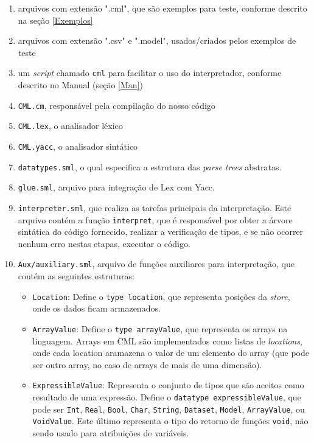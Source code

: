 \documentclass[12pt]{article}
\begin{document}
\begin{enumerate}
	\item arquivos com extensão ".cml", que são exemplos para teste, conforme descrito na seção \ref{Exemplos}
	\item arquivos com extensão ".csv" e ".model", usados/criados pelos exemplos de teste
	\item um \textit{script} chamado \texttt{cml} para facilitar o uso do interpretador, conforme descrito no Manual (seção \ref{Man})
	\item \texttt{CML.cm}, responsável pela compilação do nosso código
	\item \texttt{CML.lex}, o analisador léxico
	\item \texttt{CML.yacc}, o analisador sintático
	\item \texttt{datatypes.sml}, o qual especifica a estrutura das \textit{parse trees} abstratas.
	\item \texttt{glue.sml}, arquivo para integração de Lex com Yacc.
	\item \texttt{interpreter.sml}, que realiza as tarefas principais da interpretação. Este arquivo contém a função \texttt{interpret}, que é responsável por obter a árvore sintática do código fornecido, realizar a verificação de tipos, e se não ocorrer nenhum erro nestas etapas, executar o código.
	\item \texttt{Aux/auxiliary.sml}, arquivo de funções auxiliares para interpretação, que contém as seguintes estruturas:
\begin{itemize}
\item \texttt{Location}: Define o  \texttt{type location}, que representa posições da \textit{store}, onde os dados ficam armazenados.

\item \texttt{ArrayValue}: Define o \texttt{type arrayValue}, que representa os arrays na linguagem. Arrays em CML são implementados como listas de \textit{locations}, onde cada location aramazena o valor de um elemento do array (que pode ser outro array, no caso de arrays de mais de uma dimensão).

\item \texttt{ExpressibleValue}: Representa o conjunto de tipos que são aceitos como resultado de uma expressão. Define o \texttt{datatype expressibleValue}, que pode ser \texttt{Int}, \texttt{Real}, \texttt{Bool}, \texttt{Char}, \texttt{String}, \texttt{Dataset}, \texttt{Model}, \texttt{ArrayValue}, ou \texttt{VoidValue}. Este último representa o tipo do retorno de funções \texttt{void}, não sendo usado para atribuições de variáveis.


\end{itemize}
\end{enumerate}
\end{document}
